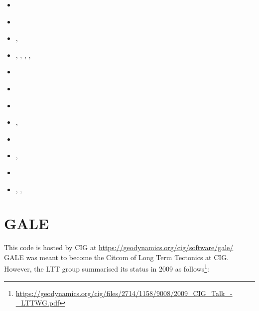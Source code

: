 \begin{small}
\begin{itemize}
\item[\twothousandeight]      \textcite{hust08b} 
\item[\twothousandeleven]     \textcite{toyu11} 
\item[\twothousandtwelve]     \textcite{nobs12}, \textcite{plsp12}
\item[\twothousandthirteen]   \textcite{hutm13}, \textcite{plth13},  \textcite{nobr13},
                              \textcite{plbs13}, \textcite{pltb13}
\item[\twothousandfifteen]    \textcite{plht15}
\item[\twothousandsixteen]    \textcite{plhm16}
\item[\twothousandseventeen]  \textcite{mats17}
\item[\twothousandeighteen]   \textcite{plpt18}, \textcite{plhw18}
\item[\twothousandnineteen]   \textcite{neum19}
\item[\twothousandtwenty]     \textcite{agtb20},  \textcite{sctp20}
\item[\twothousandtwentyfour] \textcite{flph24}
\item[\twothousandtwentyfive] \textcite{momh25}, \textcite{pamp25}, \textcite{sapb25}
\end{itemize}
\end{small}


\section{GALE} 

This code is hosted by CIG at \url{https://geodynamics.org/cig/software/gale/}
GALE was meant to become the Citcom of Long Term Tectonics at CIG. However, 
the LTT group summarised its status in 2009 as 
follows\footnote{\url{https://geodynamics.org/cig/files/2714/1158/9008/2009_CIG_Talk_-_LTTWG.pdf}}:

